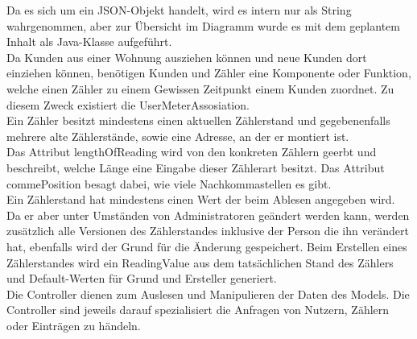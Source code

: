 Da es sich um ein JSON-Objekt handelt, wird es intern nur als String wahrgenommen, aber zur Übersicht im Diagramm wurde es mit dem geplantem Inhalt als Java-Klasse aufgeführt.\\
Da Kunden aus einer Wohnung ausziehen können und neue Kunden dort einziehen können, benötigen Kunden und Zähler eine Komponente oder Funktion, welche einen Zähler zu einem Gewissen Zeitpunkt einem Kunden zuordnet. 
Zu diesem Zweck existiert die UserMeterAssosiation.\\
Ein Zähler besitzt mindestens einen aktuellen Zählerstand und gegebenenfalls mehrere alte Zählerstände, sowie eine Adresse, an der er montiert ist.\\
Das Attribut lengthOfReading wird von den konkreten Zählern geerbt und beschreibt, welche Länge eine Eingabe dieser Zählerart besitzt. Das Attribut commePosition besagt dabei, wie viele Nachkommastellen es gibt.\\
Ein Zählerstand hat mindestens einen Wert der beim Ablesen angegeben wird. 
Da er aber unter Umständen von Administratoren geändert werden kann, werden zusätzlich alle Versionen des Zählerstandes inklusive der Person die ihn verändert hat, ebenfalls wird der Grund für die Änderung gespeichert.
Beim Erstellen eines Zählerstandes wird ein ReadingValue aus dem tatsächlichen Stand des Zählers und Default-Werten für Grund und Ersteller generiert.\\
Die Controller dienen zum Auslesen und Manipulieren der Daten des Models. 
Die Controller sind jeweils darauf spezialisiert die Anfragen von Nutzern, Zählern oder Einträgen zu händeln.

